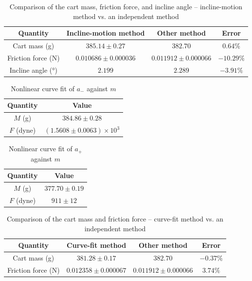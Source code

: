 \begin{table}[htb!]
\centering
\caption{Comparison of the cart mass, friction force, and incline angle -- incline-motion method vs. an independent method}
\begin{tabular}{cccc}
\toprule
Quantity & Incline-motion method & Other method & Error \\
\midrule
Cart mass (\unit{\g}) & $385.14 \pm 0.27$ & $382.70$ & $0.64\%$ \\
Friction force (\unit{\N}) & $0.010686 \pm 0.000036$ & $0.011912 \pm 0.000066$ & $-10.29\%$ \\
Incline angle (\unit{\degree}) & $2.199$ & $2.289$ & $-3.91\%$ \\
\bottomrule
\end{tabular}
\end{table}
\begin{table}[htb!]
\centering
\caption{Nonlinear curve fit of $a_{-}$ against $m$}
\begin{tabular}{cc}
\toprule
Quantity & Value \\
\midrule
$M$ (\unit{\g}) & $384.86 \pm 0.28$ \\
$F$ (dyne) & $(1.5608 \pm 0.0063)\times 10^{3}$ \\
\bottomrule
\end{tabular}
\end{table}
\begin{table}[htb!]
\centering
\caption{Nonlinear curve fit of $a_{+}$ against $m$}
\begin{tabular}{cc}
\toprule
Quantity & Value \\
\midrule
$M$ (\unit{\g}) & $377.70 \pm 0.19$ \\
$F$ (dyne) & $911 \pm 12$ \\
\bottomrule
\end{tabular}
\end{table}
\begin{table}[htb!]
\centering
\caption{Comparison of the cart mass and friction force -- curve-fit method vs. an independent method}
\begin{tabular}{cccc}
\toprule
Quantity & Curve-fit method & Other method & Error \\
\midrule
Cart mass (\unit{\g}) & $381.28 \pm 0.17$ & $382.70$ & $-0.37\%$ \\
Friction force (\unit{\N}) & $0.012358 \pm 0.000067$ & $0.011912 \pm 0.000066$ & $3.74\%$ \\
\bottomrule
\end{tabular}
\end{table}
